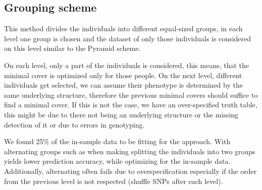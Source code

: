 \documentclass[letterpaper, 11pt]{article}
\begin{document}
\subsection{Grouping scheme}
\begin{figure} [!h] 
\end{figure}
This method divides the individuals into different equal-sized groups, in each level one group is chosen and the dataset of only those individuals is considered on this level similar to the Pyramid scheme. 

On each level, only a part of the individuals is considered, this means, that the minimal cover is optimized only for those people. On the next level, different individuals get selected, we can assume their phenotype is determined by the same underlying structure, therefore the previous minimal covers should suffice to find a minimal cover. If this is not the case, we have an over-specified truth table, this might be due to there not being an underlying structure or the missing detection of it or due to errors in genotyping. 

We found 25\% of the in-sample data to be fitting for the approach. With alternating groups such as when making splitting the individuals into two groups yields lower prediction accuracy, while optimizing for the in-sample data. Additionally, alternating often fails due to overspecification especially if the order from the previous level is not respected (shuffle SNPs after each level).
\end{document}
